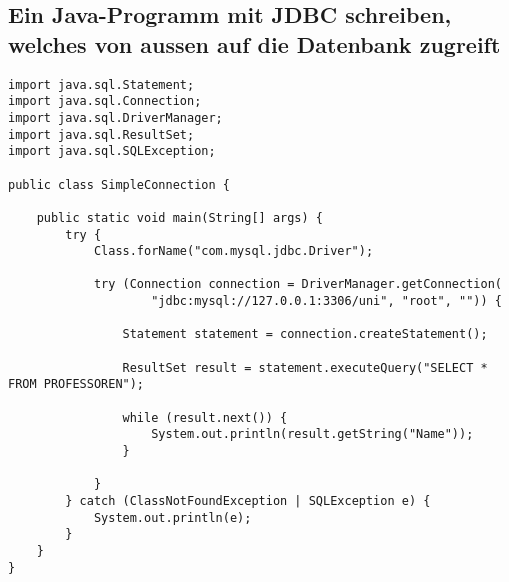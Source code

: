 \subsection{Ein Java-Programm mit JDBC schreiben, welches von aussen auf die Datenbank zugreift}

\begin{lstlisting}[caption={JDBC Beispielprogramm},label=lst:jdbc_sample]
import java.sql.Statement;
import java.sql.Connection;
import java.sql.DriverManager;
import java.sql.ResultSet;
import java.sql.SQLException;

public class SimpleConnection {

    public static void main(String[] args) {
        try {
            Class.forName("com.mysql.jdbc.Driver");

            try (Connection connection = DriverManager.getConnection(
                    "jdbc:mysql://127.0.0.1:3306/uni", "root", "")) {

                Statement statement = connection.createStatement();

                ResultSet result = statement.executeQuery("SELECT * FROM PROFESSOREN");

                while (result.next()) {
                    System.out.println(result.getString("Name"));
                }

            }
        } catch (ClassNotFoundException | SQLException e) {
            System.out.println(e);
        }
    }
}
\end{lstlisting}